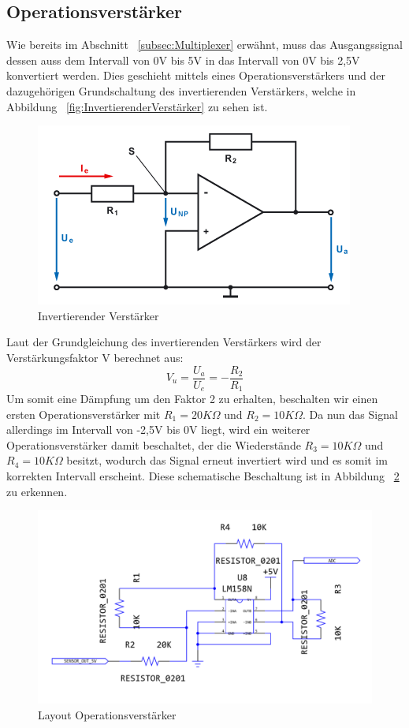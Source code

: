 \subsection{Operationsverstärker}\label{subsec:Operationsverstärker}
Wie bereits im Abschnitt ~\ref{subsec:Multiplexer} erwähnt, muss das Ausgangssignal dessen auss dem Intervall von 0V bis 5V in das Intervall von 0V bis 2,5V konvertiert werden. Dies geschieht mittels eines Operationsverstärkers und der dazugehörigen Grundschaltung des invertierenden Verstärkers, welche in Abbildung ~\ref{fig:InvertierenderVerstärker} zu sehen ist.
\begin{figure}[H]
	\includegraphics{images/InvertierenderVerstaerker.png}	
	\caption{Invertierender Verstärker}
	\label{fig:InvertierenderVerstaerker}
\end{figure}
Laut der Grundgleichung des invertierenden Verstärkers wird der Verstärkungsfaktor V berechnet aus:
\[ V_u = \frac{U_a}{U_e} = -\frac{R_2}{R_1} \]
Um somit eine Dämpfung um den Faktor 2 zu erhalten, beschalten wir einen ersten Operationsverstärker mit \(R_1 = 20K\Omega\) und \(R_2 = 10K\Omega\). Da nun das Signal allerdings im Intervall von -2,5V bis 0V liegt, wird ein weiterer Operationsverstärker damit beschaltet, der die Wiederstände \(R_3 = 10K\Omega\) und \(R_4 = 10K\Omega\) besitzt, wodurch das Signal erneut invertiert wird und es somit im korrekten Intervall erscheint. 
\newline
Diese schematische Beschaltung ist in Abbildung ~\ref{fig:Layout_OP} zu erkennen.
\begin{figure}[H]
	\includegraphics[width=\textwidth]{images/Layout_OP.png}	
	\caption{Layout Operationsverstärker}
	\label{fig:Layout_OP}
\end{figure}
